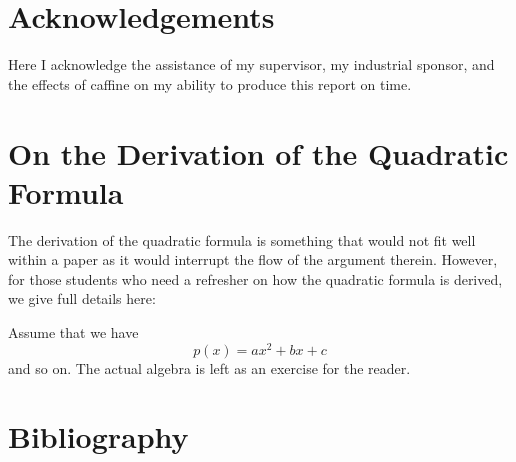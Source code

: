 \documentclass[final,3p,times,twocolumn]{elsarticle}
\begin{document}
\section*{Acknowledgements}
Here I acknowledge the assistance of my supervisor, my industrial sponsor,
and the effects of caffine on my ability to produce this report on time.

\appendix

\section{On the Derivation of the Quadratic Formula}
\label{app:quad}
The derivation of the quadratic formula is something that would not
fit well within a paper as it would interrupt the flow of the argument
therein. However, for those students who need a refresher on how the
quadratic formula is derived, we give full details here:\par
Assume that we have
\begin{equation}
p(x) = ax^2 + bx + c
\end{equation}
and so on. The actual algebra is left as an exercise for the reader.


\section*{Bibliography}








\end{document}

